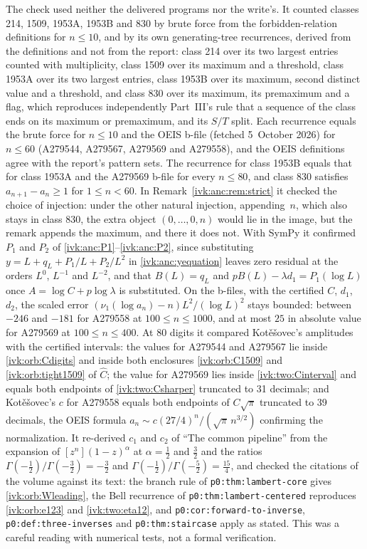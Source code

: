 \documentclass[11pt,letterpaper]{article}
\theoremstyle{remark}\newtheorem{remark}[theorem]{Remark}
\begin{document}
The check used neither the delivered programs nor the write's. It counted classes 214, 1509, 1953A, 1953B and 830 by brute force from the forbidden-relation definitions for $n\le10$, and by its own generating-tree recurrences, derived from the definitions and not from the report: class 214 over its two largest entries counted with multiplicity, class 1509 over its maximum and a threshold, class 1953A over its two largest entries, class 1953B over its maximum, second distinct value and a threshold, and class 830 over its maximum, its premaximum and a flag, which reproduces independently Part~III's rule that a sequence of the class ends on its maximum or premaximum, and its $S/T$ split. Each recurrence equals the brute force for $n\le10$ and the OEIS b-file (fetched 5~October 2026) for $n\le60$ (A279544, A279567, A279569 and A279558), and the OEIS definitions agree with the report's pattern sets. The recurrence for class 1953B equals that for class 1953A and the A279569 b-file for every $n\le80$, and class 830 satisfies $a_{n+1}-a_n\ge1$ for $1\le n<60$. In Remark~\ref{ivk:anc:rem:strict} it checked the choice of injection: under the other natural injection, appending~$n$, which also stays in class 830, the extra object $(0,\ldots,0,n)$ would lie in the image, but the remark appends the maximum, and there it does not. With SymPy it confirmed $P_1$ and $P_2$ of \eqref{ivk:anc:P1}--\eqref{ivk:anc:P2}, since substituting $y=L+q_L+P_1/L+P_2/L^2$ in \eqref{ivk:anc:yequation} leaves zero residual at the orders $L^0$, $L^{-1}$ and $L^{-2}$, and that $B(L)=q_L$ and $pB(L)-\lambda d_1=P_1(\log L)$ once $A=\log C+p\log\lambda$ is substituted. On the b-files, with the certified $C$, $d_1$, $d_2$, the scaled error $(\nu_1(\log a_n)-n)L^2/(\log L)^2$ stays bounded: between $-246$ and $-181$ for A279558 at $100\le n\le1000$, and at most $25$ in absolute value for A279569 at $100\le n\le400$. At 80 digits it compared Kot\v{e}\v{s}ovec's amplitudes with the certified intervals: the values for A279544 and A279567 lie inside \eqref{ivk:orb:Cdigits} and inside both enclosures \eqref{ivk:orb:C1509} and \eqref{ivk:orb:tight1509} of $\widehat C$; the value for A279569 lies inside \eqref{ivk:two:Cinterval} and equals both endpoints of \eqref{ivk:two:Csharper} truncated to 31 decimals; and Kot\v{e}\v{s}ovec's $c$ for A279558 equals both endpoints of $C\sqrt\pi$ truncated to 39 decimals, the OEIS formula $a_n\sim c(27/4)^n/(\sqrt\pi\,n^{3/2})$ confirming the normalization. It re-derived $c_1$ and $c_2$ of ``The common pipeline'' from the expansion of $[z^n](1-z)^\alpha$ at $\alpha=\frac12$ and $\frac32$ and the ratios $\Gamma(-\frac12)/\Gamma(-\frac32)=-\frac32$ and $\Gamma(-\frac12)/\Gamma(-\frac52)=\frac{15}4$, and checked the citations of the volume against its text: the branch rule of \texttt{p0:thm:lambert-core} gives \eqref{ivk:orb:Wleading}, the Bell recurrence of \texttt{p0:thm:lambert-centered} reproduces \eqref{ivk:orb:e123} and \eqref{ivk:two:eta12}, and \texttt{p0:cor:forward-to-inverse}, \texttt{p0:def:three-inverses} and \texttt{p0:thm:staircase} apply as stated. This was a careful reading with numerical tests, not a formal verification.
\end{document}

